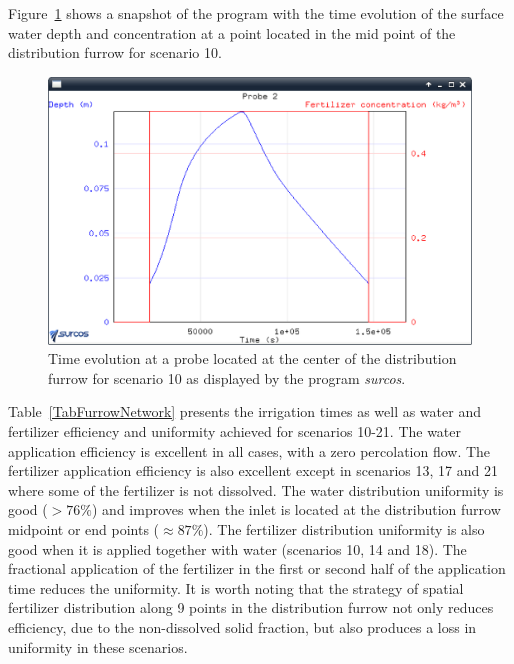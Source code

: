 \documentclass[review,authoryear]{elsarticle}
\begin{document}
Figure~\ref{evoSonda} shows a snapshot of the program with the time evolution of
the surface water depth and concentration at a point located in the mid point of
the distribution furrow for scenario 10. 
\begin{figure}[ht!]
\begin{center}
\includegraphics[width=\textwidth]{evoSondaEN.eps}
\caption{Time evolution at a probe located at the center of the distribution
furrow for scenario 10 as displayed by the program \emph{surcos}.}\label{evoSonda}
\end{center}
\end{figure}

Table~\ref{TabFurrowNetwork} presents the irrigation times as well as water and
fertilizer efficiency and uniformity achieved for scenarios 10-21.  The water application efficiency is excellent in all cases, with a
zero percolation flow. The fertilizer application efficiency is also excellent
except in scenarios 13, 17 and 21 where some of the fertilizer is not dissolved. 
The water distribution uniformity is good ($>76\%$) and improves when the inlet
is located at the distribution furrow midpoint or end points ($\approx 87\%$).
The fertilizer distribution uniformity is also good when it is applied together
with water (scenarios 10, 14 and 18). The fractional application of the fertilizer in
the first or second half of the application time reduces the uniformity. It is
worth noting that the strategy of spatial fertilizer distribution along 9 points
in the distribution furrow not only reduces efficiency, due to the non-dissolved
solid fraction, but also produces a loss in uniformity in these scenarios.
\end{document}
